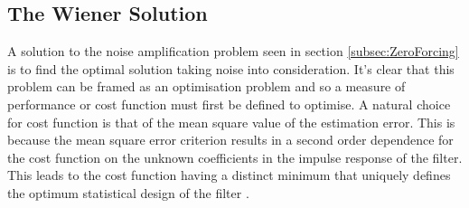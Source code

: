 \subsection{The Wiener Solution}
A solution to the noise amplification problem seen in %
section \ref{subsec:ZeroForcing} is to find the optimal %
solution taking noise into consideration. It's clear that %
this problem can be framed as an optimisation problem %
and so a measure of performance or cost function must %
first be defined to optimise. A natural choice for cost function %
is that of the mean square value of the estimation error. This %
is because the mean square error criterion results in a %
second order dependence for the cost function on the %
unknown coefficients in the impulse response of %
the filter. This leads to the cost function having a distinct %
minimum that uniquely defines the optimum %
statistical design of the filter \cite{Hay02}.
